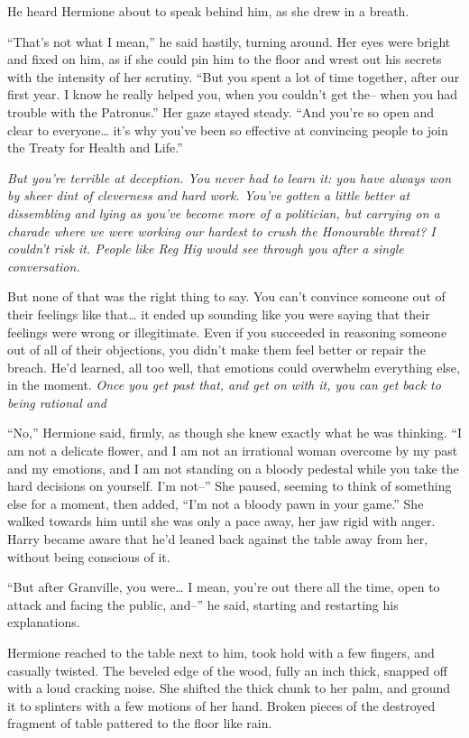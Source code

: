 He heard Hermione about to speak behind him, as she drew in a breath.

``That's not what I mean,'' he said hastily, turning around. Her eyes
were bright and fixed on him, as if she could pin him to the floor and
wrest out his secrets with the intensity of her scrutiny. ``But you
spent a lot of time together, after our first year. I know he really
helped you, when you couldn't get the-- when you had trouble with the
Patronus.'' Her gaze stayed steady. ``And you're so open and clear to
everyone\ldots{} it's why you've been so effective at convincing people
to join the Treaty for Health and Life.''

\emph{But you're terrible at deception. You never had to learn it: you
have always won by sheer dint of cleverness and hard work. You've gotten
a little better at dissembling and lying as you've become more of a
politician, but carrying on a charade where we were working our hardest
to crush the Honourable threat? I couldn't risk it. People like Reg Hig
would see through you after a single conversation.}

But none of that was the right thing to say. You can't convince someone
out of their feelings like that\ldots{} it ended up sounding like you
were saying that their feelings were wrong or illegitimate. Even if you
succeeded in reasoning someone out of all of their objections, you
didn't make them feel better or repair the breach. He'd learned, all too
well, that emotions could overwhelm everything else, in the moment.
\emph{Once you get past that, and get on with it, you can get back to
being rational and}

``No,'' Hermione said, firmly, as though she knew exactly what he was
thinking. ``I am not a delicate flower, and I am not an irrational woman
overcome by my past and my emotions, and I am not standing on a bloody
pedestal while you take the hard decisions on yourself. I'm not--'' She
paused, seeming to think of something else for a moment, then added,
``I'm not a bloody pawn in your game.'' She walked towards him until she
was only a pace away, her jaw rigid with anger. Harry became aware that
he'd leaned back against the table away from her, without being
conscious of it.

``But after Granville, you were\ldots{} I mean, you're out there all the
time, open to attack and facing the public, and--'' he said, starting
and restarting his explanations.

Hermione reached to the table next to him, took hold with a few fingers,
and casually twisted. The beveled edge of the wood, fully an inch thick,
snapped off with a loud cracking noise. She shifted the thick chunk to
her palm, and ground it to splinters with a few motions of her hand.
Broken pieces of the destroyed fragment of table pattered to the floor
like rain.

